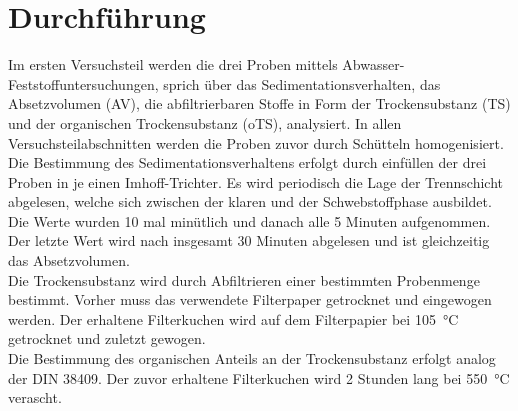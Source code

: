 \chapter{Durchführung}
\label{sec:durchfuerung}
Im ersten Versuchsteil werden die drei Proben mittels Abwasser-Feststoffuntersuchungen, sprich über das Sedimentationsverhalten, das Absetzvolumen (AV), die abfiltrierbaren Stoffe in Form der Trockensubstanz (TS) und der organischen Trockensubstanz (oTS), analysiert. In allen Versuchsteilabschnitten werden die Proben zuvor durch Schütteln homogenisiert.\\
Die Bestimmung des Sedimentationsverhaltens erfolgt durch einfüllen der drei Proben in je einen Imhoff-Trichter. Es wird periodisch die Lage der Trennschicht abgelesen, welche sich zwischen der klaren und der Schwebstoffphase ausbildet.
Die Werte wurden 10 mal minütlich und danach alle 5 Minuten aufgenommen. Der letzte Wert wird nach insgesamt 30 Minuten abgelesen und ist gleichzeitig das Absetzvolumen. \\
Die Trockensubstanz wird durch Abfiltrieren einer bestimmten Probenmenge bestimmt. Vorher muss das verwendete Filterpaper getrocknet und eingewogen werden. Der erhaltene Filterkuchen wird auf dem Filterpapier bei \SI{105}{\degreeCelsius} getrocknet und zuletzt gewogen.\\
Die Bestimmung des organischen Anteils an der Trockensubstanz erfolgt analog der DIN 38409. Der zuvor erhaltene Filterkuchen wird 2 Stunden lang bei \SI{550}{\degreeCelsius} verascht.\\


